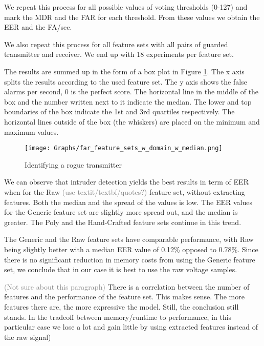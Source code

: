 \documentclass[conference]{IEEEtran}
\begin{document}
  We repeat this process for all possible values of voting thresholds (0-127) and mark the MDR and the FAR for each threshold. From these values we obtain the EER and the FA/sec.
  
  We also repeat this process for all feature sets with all pairs of guarded transmitter and receiver. We end up with 18 experiments per feature set.
  
  The results are summed up in the form of a box plot in Figure \ref{fig:rogue_transmitter_results}. The x axis splits the results according to the used feature set. The y axis shows the false alarms per second, 0 is the perfect score. The horizontal line in the middle of the box and the number written next to it indicate the median. The lower and top boundaries of the box indicate the 1st and 3rd quartiles respectively. The horizontal lines outside of the box (the whiskers) are placed on the minimum and maximum values.
  
  \begin{figure}[t]
    \centering
    \texttt{[image: Graphs/far\_feature\_sets\_w\_domain\_w\_median.png]}
    \caption{Identifying a rogue transmitter}
    \label{fig:rogue_transmitter_results}
  \end{figure}
  
  We can observe that intruder detection yields the best results in term of EER when for the Raw \textcolor{gray}{(use textit/textbf/quotes?)} feature set, without extracting features. Both the median and the spread of the values is low. The EER values for the Generic feature set are slightly more spread out, and the median is greater. The Poly and the Hand-Crafted feature sets continue in this trend.
  
  The Generic and the Raw feature sets have comparable performance, with Raw being slightly better with a median EER value of 0.12\% opposed to 0.78\%. Since there is no significant reduction in memory costs from using the Generic feature set, we conclude that in our case it is best to use the raw voltage samples.
  
  \textcolor{gray}{(Not sure about this paragraph)} There is a correlation between the number of features and the performance of the feature set. This makes sense. The more features there are, the more expressive the model. Still, the conclusion still stands. In the tradeoff between memory/runtime to performance, in this particular case we lose a lot and gain little by using extracted features instead of the raw signal)
  
\end{document}
